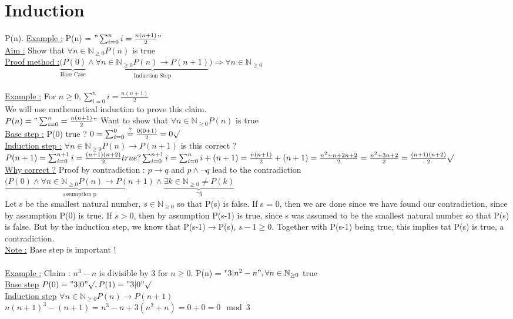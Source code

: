 \documentclass[12pt,a4paper]{article}
\begin{document}
\section{Induction}
 P(n). \underline{Example :} P(n) = $"\sum^n_{i=0} i = \frac{n(n+1)}{2}"$\\
 \underline{Aim :} Show that $\forall n \in \mathbb{N}_{\geq 0} P(n)$ is true\\
 \underline{Proof method :}$\underbrace{(P(0)}_{\text{Base Case}} \wedge \underbrace{\forall n \in \mathbb{N}_{\geq 0} P(n) \to P(n+1)}_{\text{Induction Step}}) \Longrightarrow \forall n \in \mathbb{N}_{\geq 0}$\\
 \\
 \underline{Example :} For $n \geq 0, \sum^n_{i=0}i = \frac{n(n+1)}{2}$\\
 We will use mathematical induction to prove this claim.\\
 $P(n) = "\sum^n_{i=0} = \frac{n(n+1)}{2}"$ Want to show that $\forall n \in \mathbb{N}_{\geq 0} P(n)$ is true\\
\underline{Base step :} P(0) true ? $0 = \sum^0_{i=0} \overset{?}{=} \frac{0(0+1)}{2} = 0 \surd$\\
\underline{Induction step :} $\forall n \in \mathbb{N}_{\geq 0} P(n) \to P(n+1)$ is this correct ? $P(n+1) = \sum^{n+1}_{i=0}i = \frac{(n+1)(n+2)}{2} true? \\
\sum^{n+1}_{i=0}i = \sum^{n}_{i=0}i + (n+1) = \frac{n(n+1)}{2} + (n+1) = \frac{n^2+n+2n+2}{2} = \frac{n^2 + 3n + 2}{2} = \frac{(n+1)(n+2)}{2} \surd$\\
\underline{Why correct ?} Proof by contradiction : $p \to q$ and $p \wedge \neg q$ lead to the contradiction
$\underbrace{(P(0) \wedge \forall n \in \mathbb{N}_{\geq 0} P(n) \to P(n+1)}_{\text{assumption p}} \wedge \underbrace{\exists k \in \mathbb{N}_{\geq 0} \neq P(k)}_{\neg q}$\\
Let s be the smallest natural number, $s \in \mathbb{N}_{\geq 0}$ so that P(s) is false. If s = 0, then we are done since we have found our contradiction, since by assumption P(0) is true. If $s > 0$, then by assumption P(s-1) is true, since s was assumed to be the smallest natural number so that P(s) is false. But by the induction step, we know that P(s-1)$\to$P(s), $s-1 \geq 0$. Together with P(s-1) being true, this implies tat P(s) is true, a contradiction.\\
\underline{Note :} Base step is important !\\
\\
\underline{Example :} Claim : $n^3-n$ is divisible by 3 for $n \geq 0$. P(n) = "$3|n^2-n", \forall n \in \mathbb{N}_{\geq 0}$ true\\
\underline{Base step} $P(0) = "3|0" \surd, P(1) = "3|0" \surd$\\
\underline{Induction step} $\forall n \in \mathbb{N}_{\geq 0} P(n) \to P(n+1)$\\
$n(n+1)^3 - (n+1) = n^3-n + 3 (n^2+n) = 0 + 0 = 0 \mod 3 $
\end{document}
